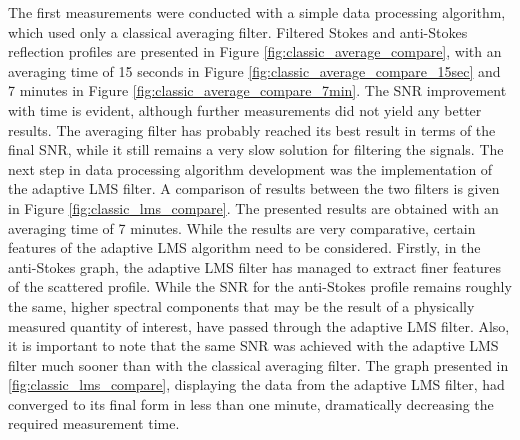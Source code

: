 \documentclass{standalone}
\begin{document}
The first measurements were conducted with a simple data processing algorithm, which used only a classical averaging filter. Filtered Stokes and anti-Stokes reflection profiles are presented in Figure \ref{fig:classic_average_compare}, with an averaging time of 15 seconds in Figure \ref{fig:classic_average_compare_15sec} and 7 minutes in Figure \ref{fig:classic_average_compare_7min}.
The SNR improvement with time is evident, although further measurements did not yield any better results. The averaging filter has probably reached its best result in terms of the final SNR, while it still remains a very slow solution for filtering the signals. The next step in data processing algorithm development was the implementation of the adaptive LMS filter. A comparison of results between the two filters is given in Figure \ref{fig:classic_lms_compare}.
The presented results are obtained with an averaging time of 7 minutes. While the results are very comparative, certain features of the adaptive LMS algorithm need to be considered. Firstly, in the anti-Stokes graph, the adaptive LMS filter has managed to extract finer features of the scattered profile. While the SNR for the anti-Stokes profile remains roughly the same, higher spectral components that may be the result of a physically measured quantity of interest, have passed through the adaptive LMS filter. Also, it is important to note that the same SNR was achieved with the adaptive LMS filter much sooner than with the classical averaging filter. The graph presented in \ref{fig:classic_lms_compare}, displaying the data from the adaptive LMS filter, had converged to its final form in less than one minute, dramatically decreasing the required measurement time. \\
\end{document}
